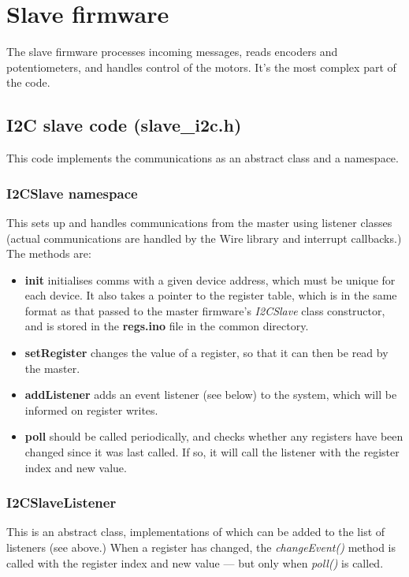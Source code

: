 \section{Slave firmware}
The slave firmware processes incoming \isqc{} messages,
reads encoders and potentiometers, and
handles control of the motors. It's the most complex part
of the code.


\subsection{I2C slave code (slave\_i2c.h)}
This code implements the communications as an abstract class and 
a namespace.

\subsubsection{I2CSlave namespace}
This sets up \isqc{} and handles communications from the master using listener classes (actual communications are
handled by the Wire library and interrupt callbacks.)
The methods are:
\begin{itemize}
\item \textbf{init} initialises comms with a given device address, which must be
unique for each device. It also takes a pointer to the register table, which is in the same format as that passed
to the master firmware's \emph{I2CSlave} class constructor, and is stored in the \textbf{regs.ino} file
in the common directory.
\item \textbf{setRegister} changes the value of a register, so that it can then be read by the master.
\item \textbf{addListener} adds an event listener (see below) to the system, which will be informed on register writes.
\item \textbf{poll} should be called periodically, and checks whether any registers have been changed since it
was last called. If so, it will call the listener with the register index and new value.
\end{itemize}

\subsubsection{I2CSlaveListener}
This is an abstract class, implementations of which can be added to the list of listeners (see above.)
When a register has changed, the \emph{changeEvent()} method is called with the register index and new value ---
but only when \emph{poll()} is called.


